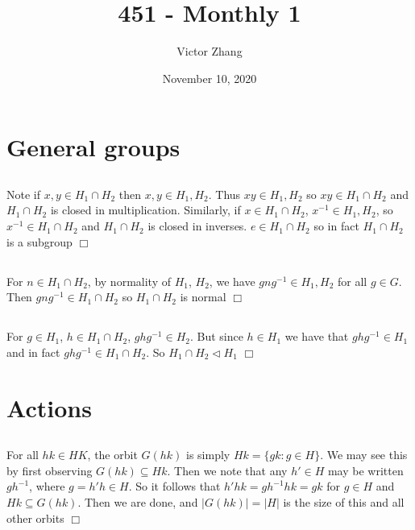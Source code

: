 \documentclass{article}
\title{451 - Monthly 1}
\author{Victor Zhang}
\date{November 10, 2020}
\begin{document}
\maketitle

\section{General groups}
\subsection{}
Note if $x,y \in H_1 \cap H_2$ then $x,y \in H_1, H_2$. Thus $xy \in H_1, H_2$ so $xy \in H_1 \cap H_2$ and $H_1 \cap H_2$ is closed in multiplication. Similarly, if $x \in H_1 \cap H_2$, $x^{-1} \in H_1, H_2$, so $x^{-1} \in H_1 \cap H_2$ and $H_1 \cap H_2$ is closed in inverses. $e \in H_1 \cap H_2$ so in fact $H_1 \cap H_2$ is a subgroup $\Box$

\subsection{}
For $n \in H_1 \cap H_2$, by normality of $H_1$, $H_2$, we have $gng^{-1} \in H_1, H_2$ for all $g \in G$. Then $gng^{-1} \in H_1 \cap H_2$ so $H_1 \cap H_2$ is normal $\Box$

\subsection{}
For $g \in H_1$, $h \in H_1 \cap H_2$, $ghg^{-1} \in H_2$. But since $h \in H_1$ we have that $ghg^{-1} \in H_1$ and in fact $ghg^{-1} \in H_1 \cap H_2$. So $H_1 \cap H_2 \lhd H_1$ $\Box$ 

\section{Actions}
\subsection{}
For all $hk \in HK$, the orbit $G(hk)$ is simply $Hk = \{gk : g \in H\}$. We may see this by first observing $G(hk) \subseteq Hk$. Then we note that any $h' \in H$ may be written $gh^{-1}$, where $g = h'h \in H$. So it follows that $h'hk = gh^{-1}hk = gk$ for $g \in H$ and $Hk \subseteq G(hk)$. Then we are done, and $|G(hk)| = |H|$ is the size of this and all other orbits $\Box$
\end{document}
